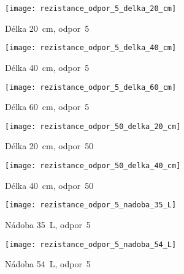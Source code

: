 \begin{figure}[ht]
	\label{img:pic_rezistance_odpor_5_delka_20_cm}
	\begin{center}
		\texttt{[image: rezistance\_odpor\_5\_delka\_20\_cm]}
		\caption{Délka \SI{20}{cm}, odpor~5}
	\end{center}
\end{figure}

\begin{figure}[ht]
	\label{img:pic_rezistance_odpor_5_delka_40_cm}
	\begin{center}
		\texttt{[image: rezistance\_odpor\_5\_delka\_40\_cm]}
		\caption{Délka \SI{40}{cm}, odpor~5}
	\end{center}
\end{figure}

\begin{figure}[ht]
	\label{img:pic_rezistance_odpor_5_delka_60_cm}
	\begin{center}
		\texttt{[image: rezistance\_odpor\_5\_delka\_60\_cm]}
		\caption{Délka \SI{60}{cm}, odpor~5}
	\end{center}
\end{figure}

\begin{figure}[ht]
	\label{img:pic_rezistance_odpor_50_delka_20_cm}
	\begin{center}
		\texttt{[image: rezistance\_odpor\_50\_delka\_20\_cm]}
		\caption{Délka \SI{20}{cm}, odpor~50}
	\end{center}
\end{figure}

\begin{figure}[ht]
	\label{img:pic_rezistance_odpor_50_delka_40_cm}
	\begin{center}
		\texttt{[image: rezistance\_odpor\_50\_delka\_40\_cm]}
		\caption{Délka \SI{40}{cm}, odpor~50}
	\end{center}
\end{figure}

\begin{figure}[ht]
	\label{img:pic_rezistance_odpor_5_nadoba_35_L}
	\begin{center}
		\texttt{[image: rezistance\_odpor\_5\_nadoba\_35\_L]}
		\caption{Nádoba \SI{35}{L}, odpor~5}
	\end{center}
\end{figure}

\begin{figure}[ht]
	\label{img:pic_rezistance_odpor_5_nadoba_54_L}
	\begin{center}
		\texttt{[image: rezistance\_odpor\_5\_nadoba\_54\_L]}
		\caption{Nádoba \SI{54}{L}, odpor~5}
	\end{center}
\end{figure}

